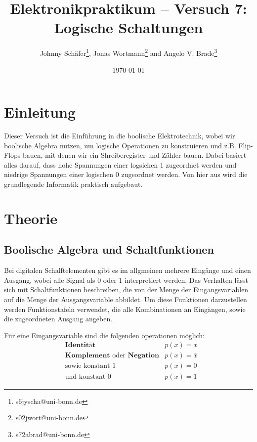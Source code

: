 \documentclass[10pt]{article}
\title{Elektronikpraktikum -- Versuch 7: Logische Schaltungen}
\author[1]{Johnny Schäfer\thanks{s6jyscha@uni-bonn.de}, Jonas Wortmann\thanks{s02jwort@uni-bonn.de} and Angelo V. Brade\thanks{s72abrad@uni-bonn.de}}
\affil[1]{Rheinische Friedrich-Wilhelms-Universität Bonn}
\date{\today}
\begin{document}
\maketitle
\newpage

\tableofcontents
\newpage


\pagestyle{fancy}
\fancyhead[R]{\thepage}
\fancyhead[L]{\leftmark}


\begin{multicols}{2}
	\section{Einleitung}
	Dieser Versuch ist die Einführung in die boolische Elektrotechnik, wobei wir boolische Algebra nutzen, um logische Operationen zu konstruieren und z.B. Flip-Flops bauen, mit denen wir ein Shreiberegister und Zähler bauen. Dabei basiert alles darauf, dass hohe Spannungen einer logsichen 1 zugeordnet werden und niedrige Spannungen einer logischen 0 zugeordnet werden. Von hier aus wird die grundlegende Informatik praktisch aufgebaut.

	\section{Theorie}
	\subsection{Boolische Algebra und Schaltfunktionen}
	Bei digitalen Schalftelementen gibt es im allgmeinen mehrere Eingänge und einen Ausgang, wobei alle Signal als 0 oder 1 interpretiert werden. Das Verhalten lässt sich mit Schaltfunktionen beschreiben, die von der Menge der Eingangsvariablen auf die Menge der Ausgangsvariable abbildet. Um diese Funktionen darzustellen werden Funktionstafeln verwendet, die alle Kombinationen an Eingängen, sowie die zugeordneten Ausgang angeben.

	Für eine Eingangsvariable sind die folgenden operationen möglich:
	\begin{align*}
		 & \textbf{Identität}                                  & p(x) = x       \\
		 & \textbf{Komplement} \text{ oder } \textbf{Negation} & p(x) = \bar{x} \\
		 & \text{sowie konstant 1}                             & p(x) = 0       \\
		 & \text{und konstant 0}                               & p(x) = 1
	\end{align*}


\end{multicols}
\end{document}
